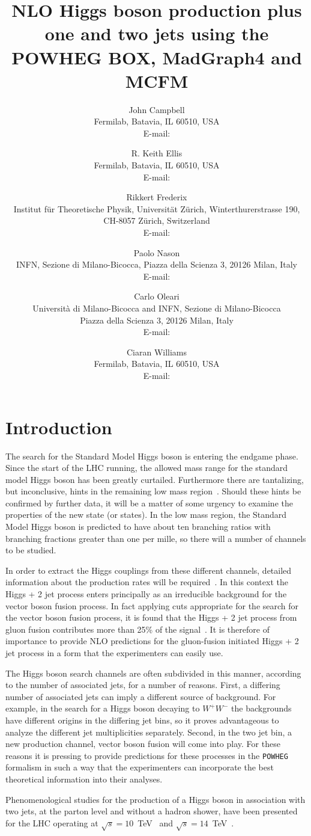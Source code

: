 \documentclass[paper]{JHEP3}
\title{NLO Higgs boson production plus one and two jets
using the POWHEG BOX, MadGraph4 and MCFM}
\author{John Campbell\\
Fermilab, Batavia, IL 60510, USA\\
  E-mail: \email{johnmc@fnal.gov}}
\author{R. Keith Ellis\\
Fermilab, Batavia, IL 60510, USA\\
  E-mail: \email{ellis@fnal.gov}}
\author{Rikkert Frederix\\
  Institut f\"ur Theoretische Physik,
  Universit\"at Z\"urich, Winterthurerstrasse 190, CH-8057 Z\"urich,
  Switzerland\\
  E-mail: \email{frederix@physik.uzh.ch}}
\author{Paolo Nason\\
  INFN, Sezione di Milano-Bicocca,
  Piazza della Scienza 3, 20126 Milan, Italy\\
  E-mail: \email{Paolo.Nason@mib.infn.it}}
\author{Carlo Oleari\\
  Universit\`a di Milano-Bicocca and INFN, Sezione di Milano-Bicocca\\
  Piazza della Scienza 3, 20126 Milan, Italy\\
  E-mail: \email{Carlo.Oleari@mib.infn.it}}
\author{Ciaran Williams\\
Fermilab, Batavia, IL 60510, USA\\
  E-mail: \email{ciaran@fnal.gov}}
\newcommand\POWHEG{{\tt POWHEG}}
\begin{document}
\section{Introduction}
The search for the Standard Model Higgs boson is entering the endgame phase.
Since the start of the LHC running, the allowed mass range for the standard
model Higgs boson has been greatly curtailed. Furthermore there are
tantalizing, but inconclusive, hints in the remaining low mass
region~\cite{Collaboration:2012si, Chatrchyan:2012tx}. Should these hints be
confirmed by further data, it will be a matter of some urgency to examine the
properties of the new state (or states). In the low mass region, the
Standard Model Higgs boson is predicted to have about ten branching ratios
with branching fractions greater than one per mille, so there will a number
of channels to be studied.

In order to extract the Higgs couplings from these different channels, detailed
information about the production rates will be
required~\cite{Zeppenfeld:2000td, Duhrssen:2004cv, Plehn:2001nj}.
In this context the Higgs + 2 jet process enters principally as an irreducible 
background for the vector boson fusion process. In fact applying cuts 
appropriate for the search for the vector boson fusion process, it is found 
that the Higgs + 2 jet process from gluon fusion contributes more than 
25\% of the signal~\cite{Campbell:2010cz}. 
It is therefore of importance to provide NLO 
predictions for the gluon-fusion initiated Higgs + 2 jet process in a 
form that the experimenters can easily use.

The Higgs boson search channels are often subdivided in this manner, according to
the number of associated jets, for a number of reasons.
First, a differing number of associated jets can imply a
different source of background.  For example, in the search for a Higgs boson
decaying to $W^+ W^-$ the backgrounds have different origins in the
differing jet bins, so it proves advantageous to analyze the different jet
multiplicities separately. Second, in the two jet bin, a new production
channel, vector boson fusion will come into play. For these reasons it is
pressing to provide predictions for these processes in the \POWHEG{}
formalism in such a way that the experimenters can incorporate the best
theoretical information into their analyses.

Phenomenological studies for the production of a Higgs boson in association
with two jets, at the parton level and without a hadron shower, have been
presented for the LHC operating at $\sqrt{s} = 10$~TeV~\cite{Campbell:2010cz}
and $\sqrt{s} = 14$~TeV~\cite{Campbell:2006xx}.
\end{document}
